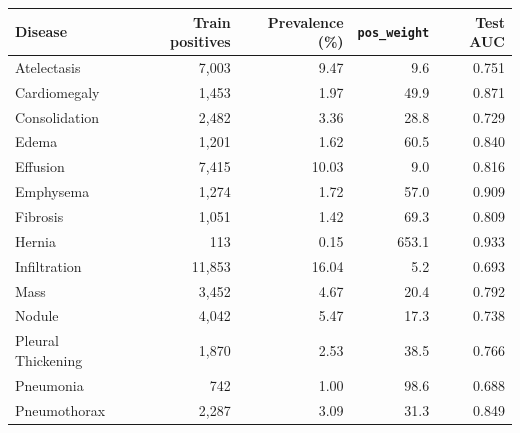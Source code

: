 \begin{tabular}{lrrrr}
\toprule
Disease & Train positives & Prevalence (\%) & \texttt{pos\_weight} & Test AUC \\
\midrule
Atelectasis & 7{,}003 & 9.47 & 9.6 & 0.751 \\
Cardiomegaly & 1{,}453 & 1.97 & 49.9 & 0.871 \\
Consolidation & 2{,}482 & 3.36 & 28.8 & 0.729 \\
Edema & 1{,}201 & 1.62 & 60.5 & 0.840 \\
Effusion & 7{,}415 & 10.03 & 9.0 & 0.816 \\
Emphysema & 1{,}274 & 1.72 & 57.0 & 0.909 \\
Fibrosis & 1{,}051 & 1.42 & 69.3 & 0.809 \\
Hernia & 113 & 0.15 & 653.1 & 0.933 \\
Infiltration & 11{,}853 & 16.04 & 5.2 & 0.693 \\
Mass & 3{,}452 & 4.67 & 20.4 & 0.792 \\
Nodule & 4{,}042 & 5.47 & 17.3 & 0.738 \\
Pleural Thickening & 1{,}870 & 2.53 & 38.5 & 0.766 \\
Pneumonia & 742 & 1.00 & 98.6 & 0.688 \\
Pneumothorax & 2{,}287 & 3.09 & 31.3 & 0.849 \\
\bottomrule
\end{tabular}
